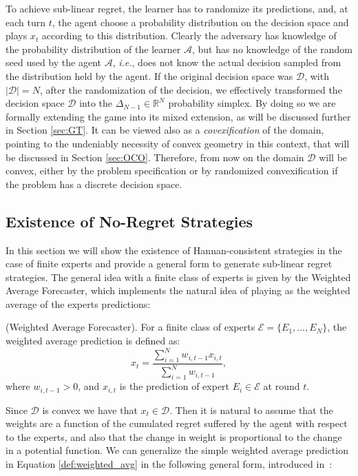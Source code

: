 To achieve sub-linear regret, the learner has to randomize its predictions, and, at each turn $t$, the agent choose a probability distribution on the decision space and plays $x_t$ according to this distribution. Clearly the adversary has knowledge of the probability distribution of the learner $\mathcal A$, but has no knowledge of the random seed used by the agent $\mathcal A$, \emph{i.e.}, does not know the actual decision sampled from the distribution held by the agent. If the original decision space was $\mathcal D$, with $|\mathcal D|=N$, after the randomization of the decision, we effectively transformed the decision space $\mathcal D$ into the $\Delta_{N-1}\in\mathbb R^{N}$ probability simplex. By doing so we are formally extending the game into its mixed extension, as will be discussed further in Section \ref{sec:GT}. It can be viewed also as a \emph{covexification} of the domain, pointing to the undeniably necessity of convex geometry in this context, that will be discussed in Section \ref{sec:OCO}. Therefore, from now on the domain $\mathcal D$ will be convex, either by the problem specification or by randomized convexification if the problem has a discrete decision space.

\subsection{Existence of No-Regret Strategies}\label{sec:existence_of_no_regret}
In this section we will show the existence of Hannan-consistent strategies in the case of finite experts and provide a general form to generate sub-linear regret strategies. 
The general idea with a finite class of experts is given by the Weighted Average Forecaster, which implements the natural idea of playing as the weighted average of the experts predictions:

\begin{definition}(Weighted Average Forecaster).\label{def:weighted_avg}
For a finite class of experts $\mathcal E=\{E_1,\ldots,E_N\}$, the weighted average prediction is defined as:
\begin{equation}
	x_t = \frac{\sum\limits_{i=1}^{N}w_{i,t-1}x_{i,t}}{\sum\limits_{i=1}^{N}w_{i,t-1}},
\end{equation}
where $w_{i,t-1}>0$, and $x_{i,t}$ is the prediction of expert $E_i\in\mathcal E$ at round $t$. 
\end{definition}

Since $\mathcal D$ is convex we have that $x_t\in\mathcal D$.
Then it is natural to assume that the weights are a function of the cumulated regret suffered by the agent with respect to the experts, and also that the change in weight is proportional to the change in a potential function.
We can generalize the simple weighted average prediction in Equation \eqref{def:weighted_avg} in the following general form, introduced in~\cite{cesa2003potential}:

